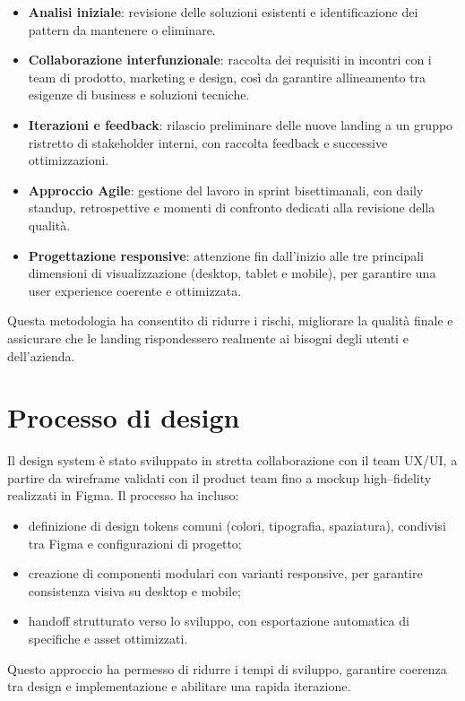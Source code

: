 \begin{itemize}
  \item \textbf{Analisi iniziale}: revisione delle soluzioni esistenti e
  identificazione dei pattern da mantenere o eliminare.
  \item \textbf{Collaborazione interfunzionale}: raccolta dei requisiti in
  incontri con i team di prodotto, marketing e design, così da garantire
  allineamento tra esigenze di business e soluzioni tecniche.
  \item \textbf{Iterazioni e feedback}: rilascio preliminare delle nuove landing
  a un gruppo ristretto di stakeholder interni, con raccolta feedback e successive
  ottimizzazioni.
  \item \textbf{Approccio Agile}: gestione del lavoro in sprint bisettimanali,
  con daily standup, retrospettive e momenti di confronto dedicati alla revisione
  della qualità.
  \item \textbf{Progettazione responsive}: attenzione fin dall’inizio alle tre
  principali dimensioni di visualizzazione (desktop, tablet e mobile), per
  garantire una user experience coerente e ottimizzata.
\end{itemize}

Questa metodologia ha consentito di ridurre i rischi, migliorare la qualità
finale e assicurare che le landing rispondessero realmente ai bisogni degli utenti
e dell’azienda.

\section{Processo di design}
Il design system è stato sviluppato in stretta collaborazione con il team UX/UI,
a partire da wireframe validati con il product team fino a mockup
high–fidelity realizzati in Figma. Il processo ha incluso:

\begin{itemize}
  \item definizione di design tokens comuni (colori, tipografia, spaziatura),
  condivisi tra Figma e configurazioni di progetto;
  \item creazione di componenti modulari con varianti responsive, per garantire
  consistenza visiva su desktop e mobile;
  \item handoff strutturato verso lo sviluppo, con esportazione automatica di
  specifiche e asset ottimizzati.
\end{itemize}

Questo approccio ha permesso di ridurre i tempi di sviluppo, garantire coerenza
tra design e implementazione e abilitare una rapida iterazione.

